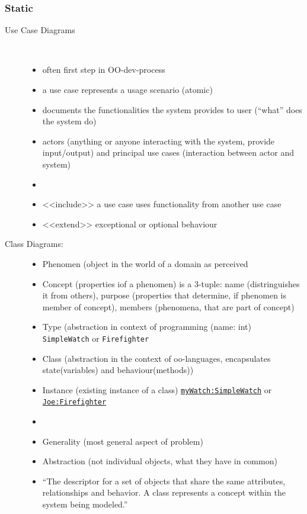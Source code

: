 \documentclass[a4paper, 10pt]{article}
\begin{document}
\subsubsection{Static}
\begin{description}
	\item[Use Case Diagrams] \ \\
	\begin{itemize}
		\item often first step in OO-dev-process
		\item a use case represents a usage scenario (atomic)
		\item documents the functionalities the system provides to user (``what'' does the system do)
		\item actors (anything or anyone interacting with the system, provide input/output) and principal use cases (interaction between actor and system)
		\item 
		\item <<include>> \follows a use case uses functionality from another use case
		\item <<extend>> \follows exceptional or optional behaviour
	\end{itemize}
	\item[Class Diagrams:]
	\begin{itemize}
		\item Phenomen (object in the world of a domain as perceived
		\item Concept (properties iof a phenomen) is a 3-tuple: name (distringuishes it from others), purpose (properties that determine, if phenomen is member of concept), members (phenomena, that are part of concept)
		\item Type (abstraction in context of programming (name: int) \\
		\texttt{SimpleWatch} or \texttt{Firefighter}
		\item Class (abstraction in the context of oo-languages, encapsulates state(variables) and behaviour(methods))
		\item Instance (existing instance of a class) \underline{\texttt{myWatch:SimpleWatch}} or \underline{\texttt{Joe:Firefighter}}
		\item 
		\item Generality (most general aspect of problem)
		\item Abstraction (not individual objects, what they have in common)
		\item 		``The descriptor for a set of objects that share the same attributes, relationships and behavior. A class represents a concept within the system being modeled.''

\end{itemize}
\end{description}
\end{document}
